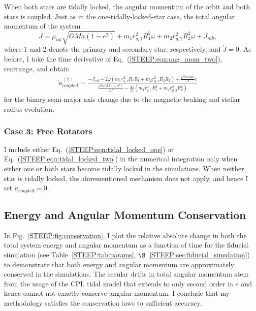 When both stars are tidally locked, the angular momentum of the orbit and both stars is coupled.  Just as in the one-tidally-locked-star case, the total angular momentum of the system 
\begin{equation} \label{STEEP:eqn:ang_mom_two}
J = \mu_{tot} \sqrt{GMa(1-e^2)} + m_1 r_{g,1}^2 R_1^2 \omega + m_2 r_{g,2}^2 R_2^2 \omega + J_{mb},
\end{equation}
where 1 and 2 denote the primary and secondary star, respectively, and $\dot{J} = 0$.  As before, I take the time derivative of Eq.~(\ref{STEEP:eqn:ang_mom_two}), rearrange, and obtain
\small
\begin{equation} \label{STEEP:eqn:tidal_locked_two}
\begin{split}
\dot{a}_{coupled}^{(2)} = \frac{-\dot{J_{mb}} - 2 \omega \left( m_1 r_{g,1}^2 R_1 \dot{R_1} + m_2 r_{g,2}^2 R_2 \dot{R_2} \right) + \frac{\mu^2 G M a e }{J} \dot{e}}
{\frac{\mu^2 G M (1-e^2)}{2J} - \frac{3 \omega}{2a} \left( m_1 r_{g,1}^2 R_1^2 + m_2 r_{g,2}^2 R_2^2 \right)}
\end{split}
\end{equation}
\normalsize
for the binary semi-major axis change due to the magnetic braking and stellar radius evolution.  

\subsubsection{Case 3: Free Rotators}

I include either Eq.~(\ref{STEEP:eqn:tidal_locked_one}) or Eq.~(\ref{STEEP:eqn:tidal_locked_two}) in the numerical integration only when either one or both stars become tidally locked in the simulations.  When neither star is tidally locked, the aforementioned mechanism does not apply, and hence I set $\dot{a}_{coupled} = 0$.

\subsection{Energy and Angular Momentum Conservation} \label{STEEP:sec:conservation}

In Fig.~\ref{STEEP:fig:conservation}, I plot the relative absolute change in both the total system energy and angular momentum as a function of time for the fiducial simulation (see Table~\ref{STEEP:tab:params}, $\S$~\ref{STEEP:sec:fiducial_simulation}) to demonstrate that both energy and angular momentum are approximately conserved in the 
\vplanet simulations.  The secular drifts in total angular momentum stem from the usage of the CPL tidal model that extends to only second order in $e$ and hence cannot not exactly conserve angular momentum.  I conclude that my methodology satisfies the conservation laws to sufficient accuracy.

